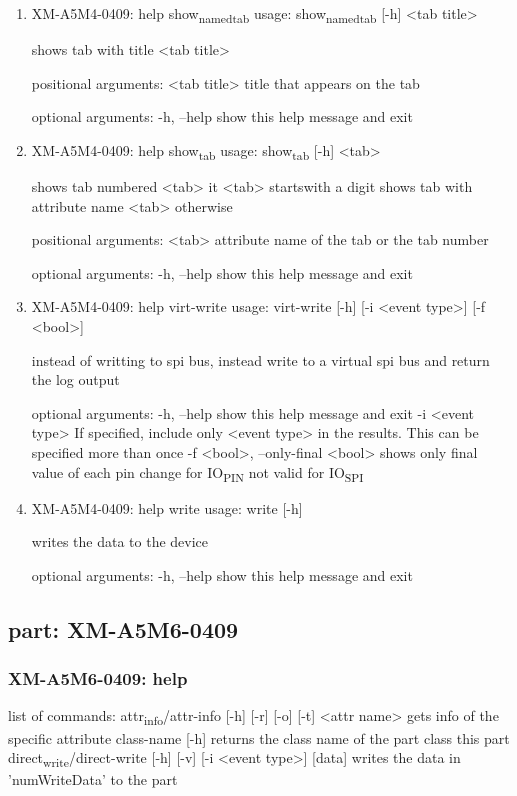 \documentclass[11pt]{article}
\begin{document}
\begin{enumerate}
\item XM-A5M4-0409: help show\textsubscript{named}\textsubscript{tab}
\label{sec:org8f07711}
usage: show\textsubscript{named}\textsubscript{tab} [-h] <tab title>

shows tab with title <tab title>

positional arguments:
  <tab title>  title that appears on the tab

optional arguments:
  -h, --help   show this help message and exit

\item XM-A5M4-0409: help show\textsubscript{tab}
\label{sec:org2a9cbb9}
usage: show\textsubscript{tab} [-h] <tab>

shows tab numbered <tab> it <tab> startswith a digit shows tab with attribute
name <tab> otherwise

positional arguments:
  <tab>       attribute name of the tab or the tab number

optional arguments:
  -h, --help  show this help message and exit

\item XM-A5M4-0409: help virt-write
\label{sec:org07f9ae3}
usage: virt-write [-h] [-i <event type>] [-f <bool>]

instead of writting to spi bus, instead write to a virtual spi bus and return
the log output

optional arguments:
  -h, --help            show this help message and exit
  -i <event type>       If specified, include only <event type> in the
                        results. This can be specified more than once
  -f <bool>, --only-final <bool>
                        shows only final value of each pin change for IO\textsubscript{PIN}
                        not valid for IO\textsubscript{SPI}

\item XM-A5M4-0409: help write
\label{sec:org7364ebd}
usage: write [-h]

writes the data to the device

optional arguments:
  -h, --help  show this help message and exit
\end{enumerate}

\subsection{part: XM-A5M6-0409}
\label{sec:org2bed37d}
\subsubsection{XM-A5M6-0409: help}
\label{sec:org254b434}
list of commands:
  attr\textsubscript{info}/attr-info [-h] [-r] [-o] [-t] <attr name>
    gets info of the specific attribute
  class-name [-h]
    returns the class name of the part class this part
  direct\textsubscript{write}/direct-write [-h] [-v] [-i <event type>] [data]
    writes the data in 'numWriteData' to the part
\end{document}

